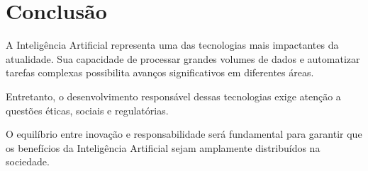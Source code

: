 \section{Conclusão}

A Inteligência Artificial representa uma das tecnologias mais impactantes da atualidade. Sua
capacidade de processar grandes volumes de dados e automatizar tarefas complexas possibilita
avanços significativos em diferentes áreas.

Entretanto, o desenvolvimento responsável dessas tecnologias exige atenção a questões éticas,
sociais e regulatórias.

O equilíbrio entre inovação e responsabilidade será fundamental para garantir que os benefícios
da Inteligência Artificial sejam amplamente distribuídos na sociedade.  
